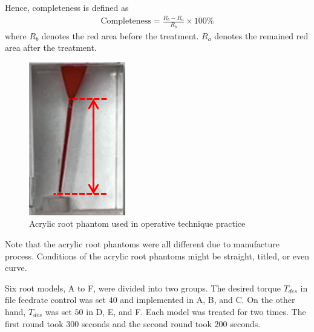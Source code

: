 \par
Hence, completeness is defined as 
\begin{equation}
\begin{split}
	\text{Completeness} = \frac{R_b - R_a}{R_b} \times 100\%
\end{split}
\end{equation}
where $R_b$ denotes the red area before the treatment. $R_a$ denotes the remained red area after the treatment.
\begin{figure}[htbp]
\begin{center}
\includegraphics[width=0.15\linewidth]{Images/root_single.png}
\caption{Acrylic root phantom used in operative technique practice}
\label{fig: root_single}
\end{center}
\end{figure}
\par
Note that the acrylic root phantoms were all different due to manufacture process. Conditions of the acrylic root phantoms might be straight, titled, or even curve. 
\par
Six root models, A to F, were divided into two groups. The desired torque $T_{des}$ in file feedrate control was set $40$ and implemented in A, B, and C. On the other hand, $T_{des}$ was set $50$ in D, E, and F. Each model was treated for two times. The first round took $300$ seconds and the second round took $200$ seconds.
